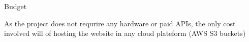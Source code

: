 \documentclass{beamer} %
\begin{document}
\begin{frame}{Budget}
        \item As the project does not requrire any hardware or paid APIs, the only cost
involved will of hosting the website in any cloud plateform (AWS S3
buckets)
    
    
    \vspace{10pt} %
    \begin{figure}
        \hfill
    \end{figure}
\end{frame}
%       
	


%       
	




      
\end{document}
